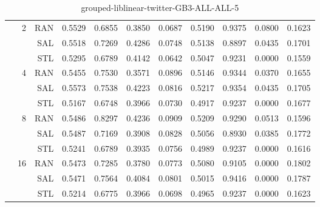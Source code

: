 \begin{center}
\begin{table}[htbp]
\begin{center}
\begin{tabular}{ | r | r | r | r | r | r | r | r | r | r | r |}
 & \multirow{3}{*}{2} & RAN & 0.5529 & 0.6855 & 0.3850 & 0.0687 & 0.5190 & 0.9375 & 0.0800 & 0.1623\\ \cline{3-11}
 &   & SAL & 0.5518 & 0.7269 & 0.4286 & 0.0748 & 0.5138 & 0.8897 & 0.0435 & 0.1701\\ \cline{3-11}
 &   & STL & 0.5295 & 0.6789 & 0.4142 & 0.0642 & 0.5047 & 0.9231 & 0.0000 & 0.1559\\ \cline{2-11}
 & \multirow{3}{*}{4} & RAN & 0.5455 & 0.7530 & 0.3571 & 0.0896 & 0.5146 & 0.9344 & 0.0370 & 0.1655\\ \cline{3-11}
 &   & SAL & 0.5573 & 0.7538 & 0.4223 & 0.0816 & 0.5217 & 0.9354 & 0.0435 & 0.1705\\ \cline{3-11}
 &   & STL & 0.5167 & 0.6748 & 0.3966 & 0.0730 & 0.4917 & 0.9237 & 0.0000 & 0.1677\\ \cline{2-11}
 & \multirow{3}{*}{8} & RAN & 0.5486 & 0.8297 & 0.4236 & 0.0909 & 0.5209 & 0.9290 & 0.0513 & 0.1596\\ \cline{3-11}
 &   & SAL & 0.5487 & 0.7169 & 0.3908 & 0.0828 & 0.5056 & 0.8930 & 0.0385 & 0.1772\\ \cline{3-11}
 &   & STL & 0.5241 & 0.6789 & 0.3935 & 0.0756 & 0.4989 & 0.9237 & 0.0000 & 0.1616\\ \cline{2-11}
 & \multirow{3}{*}{16} & RAN & 0.5473 & 0.7285 & 0.3780 & 0.0773 & 0.5080 & 0.9105 & 0.0000 & 0.1802\\ \cline{3-11}
 &   & SAL & 0.5471 & 0.7564 & 0.4084 & 0.0801 & 0.5015 & 0.9416 & 0.0000 & 0.1787\\ \cline{3-11}
 &   & STL & 0.5214 & 0.6775 & 0.3966 & 0.0698 & 0.4965 & 0.9237 & 0.0000 & 0.1623\\ \cline{2-11}
\hline
\end{tabular}
\caption{grouped-liblinear-twitter-GB3-ALL-ALL-5}
\end{center}
 \end{table}
\end{center}

